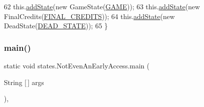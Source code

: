 \begin{DoxyCode}
62         this.\mbox{\hyperlink{classorg_1_1newdawn_1_1slick_1_1state_1_1_state_based_game_acfd4acadb4a4f79fddd7e76250da37dc}{addState}}(\textcolor{keyword}{new} GameState(\mbox{\hyperlink{classstates_1_1_not_even_an_early_access_ac1f4023cea8923ad519c090f6ba47274}{GAME}}));
63         this.\mbox{\hyperlink{classorg_1_1newdawn_1_1slick_1_1state_1_1_state_based_game_acfd4acadb4a4f79fddd7e76250da37dc}{addState}}(\textcolor{keyword}{new} FinalCredits(\mbox{\hyperlink{classstates_1_1_not_even_an_early_access_a3d511633236063385f5be1a71d44934b}{FINAL\_CREDITS}}));
64         this.\mbox{\hyperlink{classorg_1_1newdawn_1_1slick_1_1state_1_1_state_based_game_acfd4acadb4a4f79fddd7e76250da37dc}{addState}}(\textcolor{keyword}{new} DeadState(\mbox{\hyperlink{classstates_1_1_not_even_an_early_access_a2cee2d7dfd6a182fd0ea5225cf46db9b}{DEAD\_STATE}}));
65     \}
\end{DoxyCode}
\mbox{\label{classstates_1_1_not_even_an_early_access_a75dcef76735edfb3b8df5724eef5f5e0}} 
\subsubsection{\texorpdfstring{main()}{main()}}
{\footnotesize\ttfamily static void states.\+Not\+Even\+An\+Early\+Access.\+main (\begin{DoxyParamCaption}\item[{String \mbox{[}$\,$\mbox{]}}]{args }\end{DoxyParamCaption})\hspace{0.3cm}{\ttfamily [inline]}, {\ttfamily [static]}}


